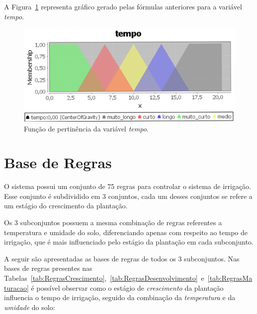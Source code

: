 \documentclass[
	article,			%
	11pt,				%
	oneside,			%
	a4paper,			%
	english,			%
	brazil,				%
	sumario=tradicional
	]{abntex2}
\begin{document}
\begin{multicols}{2}
A Figura~\ref{fig:desfuzzytempo} representa gráfico gerado pelas fórmulas anteriores para a variável \textit{tempo}.

\begin{figure}[H]
  \centering
  \includegraphics[width=1\linewidth]{desfuzzy_tempo}
  \caption{Função de pertinência da variável \textit{tempo}.}
  \label{fig:desfuzzytempo}
\end{figure}


\section{Base de Regras}

O sistema possui um conjunto de 75 regras para controlar o sistema de irrigação. Esse conjunto é subdividido em 3 conjuntos, cada um desses conjuntos se refere a um estágio do crescimento da plantação.

Os 3 subconjuntos possuem a mesma combinação de regras referentes a temperatura e umidade do solo, diferenciando apenas com respeito ao tempo de irrigação, que é mais influenciado pelo estágio da plantação em cada subconjunto.

A seguir são apresentadas as bases de regras de todos os 3 subconjuntos. Nas bases de regras presentes nas Tabelas~\ref{tab:RegrasCrescimento},~\ref{tab:RegrasDesenvolvimento}~e~\ref{tab:RegrasMaturacao} é possível observar como o estágio de \textit{crescimento} da plantação influencia o tempo de irrigação, seguido da combinação da \textit{temperatura} e da \textit{umidade} do solo:

\end{multicols}


\end{document}
